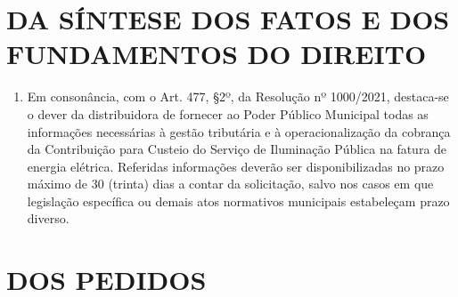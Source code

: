  


\newcommand{\Peticao}{PETIÇÃO DADOS DA CONTRIBUIÇÃO DE ILUMINAÇÃO PÚBLICA}
\newcommand{\NumeroDoc}{006}








\section{DA SÍNTESE DOS FATOS E DOS FUNDAMENTOS DO DIREITO}
\begin{enumerate}[resume]
  \item Em consonância, com o Art. 477, §2º, da Resolução nº 1000/2021, destaca-se o dever da distribuidora de fornecer ao Poder Público Municipal todas as informações necessárias à gestão tributária e à operacionalização da cobrança da Contribuição para Custeio do Serviço de Iluminação Pública na fatura de energia elétrica. Referidas informações deverão ser disponibilizadas no prazo máximo de 30 (trinta) dias a contar da solicitação, salvo nos casos em que legislação específica ou demais atos normativos municipais estabeleçam prazo diverso.
\end{enumerate}

\section{DOS PEDIDOS}

